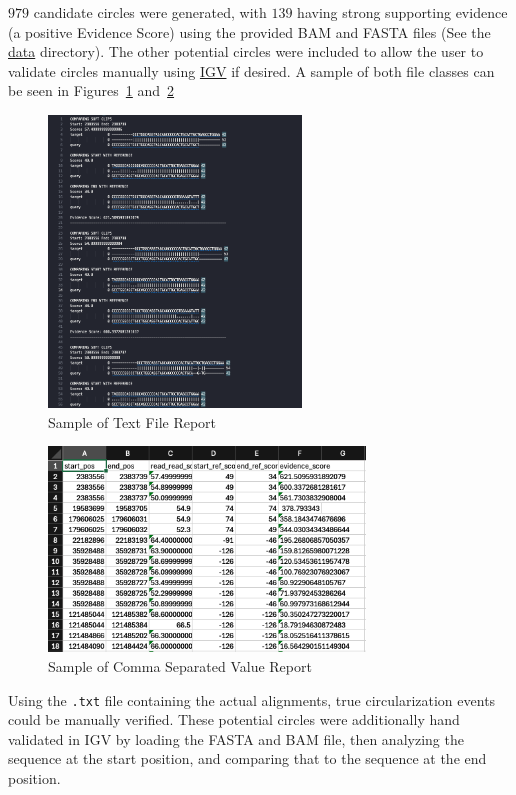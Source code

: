 \documentclass[11pt, letterpaper]{article}
\begin{document}
$979$ candidate circles were generated, with $139$ having strong supporting evidence (a positive Evidence Score) using the provided BAM and FASTA files (See the \href{}{data} directory). The other potential circles were included to allow the user to validate circles manually using \href{}{IGV} if desired. A sample of both file classes can be seen in Figures~\ref{fig:txt_ex} and~\ref{fig:csv}

\begin{figure}[H]
\centering
\includegraphics[width=0.6\textwidth]{imgs/txt_ex.png}
\caption{Sample of Text File Report}
\label{fig:txt_ex}
\end{figure}

\begin{figure}[H]
\centering
\includegraphics[width=0.75\textwidth]{imgs/csv_ex.png}
\caption{Sample of Comma Separated Value Report}
\label{fig:csv}
\end{figure}

Using the \verb|.txt| file containing the actual alignments, true circularization events could be manually verified. These potential circles were additionally hand validated in IGV by loading the FASTA and BAM file, then analyzing the sequence at the start position, and comparing that to the sequence at the end position.
\end{document}
